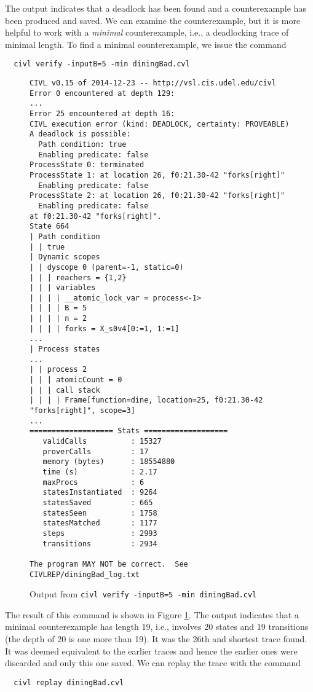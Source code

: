 The output indicates that a deadlock has been found and a
counterexample has been produced and saved. We can examine the
counterexample, but it is more helpful to work with a \emph{minimal}
counterexample, i.e., a deadlocking trace of minimal length. To find a
minimal counterexample, we issue the command

\begin{verbatim}
  civl verify -inputB=5 -min diningBad.cvl
\end{verbatim}

\begin{figure}[t]
  \begin{small}
\begin{verbatim}
CIVL v0.15 of 2014-12-23 -- http://vsl.cis.udel.edu/civl
Error 0 encountered at depth 129:
...
Error 25 encountered at depth 16:
CIVL execution error (kind: DEADLOCK, certainty: PROVEABLE)
A deadlock is possible:
  Path condition: true
  Enabling predicate: false
ProcessState 0: terminated
ProcessState 1: at location 26, f0:21.30-42 "forks[right]"
  Enabling predicate: false
ProcessState 2: at location 26, f0:21.30-42 "forks[right]"
  Enabling predicate: false
at f0:21.30-42 "forks[right]".
State 664
| Path condition
| | true
| Dynamic scopes
| | dyscope 0 (parent=-1, static=0)
| | | reachers = {1,2}
| | | variables
| | | | __atomic_lock_var = process<-1>
| | | | B = 5
| | | | n = 2
| | | | forks = X_s0v4[0:=1, 1:=1]
...
| Process states
...
| | process 2
| | | atomicCount = 0
| | | call stack
| | | | Frame[function=dine, location=25, f0:21.30-42 "forks[right]", scope=3]
...
=================== Stats ===================
   validCalls          : 15327
   proverCalls         : 17
   memory (bytes)      : 18554880
   time (s)            : 2.17
   maxProcs            : 6
   statesInstantiated  : 9264
   statesSaved         : 665
   statesSeen          : 1758
   statesMatched       : 1177
   steps               : 2993
   transitions         : 2934

The program MAY NOT be correct.  See CIVLREP/diningBad_log.txt
\end{verbatim}
  \end{small}
  \caption{Output from \texttt{civl verify -inputB=5 -min diningBad.cvl}}
  \label{fig:diningOut}
\end{figure}

The result of this command is shown in Figure \ref{fig:diningOut}. The
output indicates that a minimal counterexample has length 19, i.e.,
involves 20 states and 19 transitions (the depth of 20 is one more
than 19).    It was the 26th and shortest trace found.  It was deemed
equivalent to the earlier traces and hence the earlier ones were
discarded and only this one saved.  We can replay the trace with the command
\begin{verbatim}
  civl replay diningBad.cvl
\end{verbatim}

